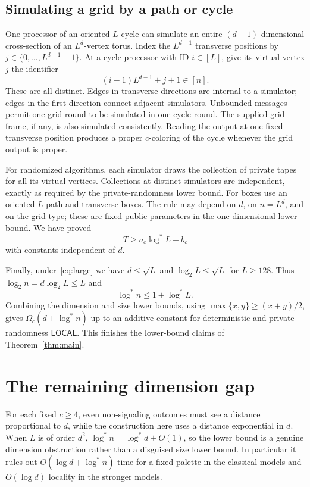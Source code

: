 \documentclass[11pt]{article}
\theoremstyle{definition}\newtheorem{definition}[theorem]{Definition}
\theoremstyle{remark}\newtheorem{remark}[theorem]{Remark}
\newcommand{\LOCAL}{\mathsf{LOCAL}}
\newcommand{\ls}{\log^*}
\begin{document}
\subsection{Simulating a grid by a path or cycle}

One processor of an oriented $L$-cycle can simulate an entire
$(d-1)$-dimensional cross-section of an $L^d$-vertex torus.
Index the $L^{d-1}$ transverse positions by
$j\in\{0,\ldots,L^{d-1}-1\}$. At a cycle processor with ID
$i\in[L]$, give its virtual vertex $j$ the identifier
\[
                           (i-1)L^{d-1}+j+1\in[n].
\]
These are all distinct. Edges in transverse directions are
internal to a simulator; edges in the first direction connect
adjacent simulators. Unbounded messages permit one grid round
to be simulated in one cycle round. The supplied grid frame,
if any, is also simulated consistently. Reading the output at
one fixed transverse position produces a proper $c$-coloring
of the cycle whenever the grid output is proper.

For randomized algorithms, each simulator draws the collection
of private tapes for all its virtual vertices. Collections
at distinct simulators are independent, exactly as required
by the private-randomness lower bound. For boxes use an
oriented $L$-path and transverse boxes. The rule may depend on
$d$, on $n=L^d$, and on the grid type; these are fixed public
parameters in the one-dimensional lower bound. We have proved
\[
                           T\ge a_c\ls L-b_c
\]
with constants independent of $d$.

Finally, under~\eqref{eq:large} we have $d\le\sqrt L$ and
$\log_2L\le\sqrt L$ for $L\ge128$. Thus
$\log_2 n=d\log_2L\le L$ and
\[
                              \ls n\le1+\ls L.
\]
Combining the dimension and size lower bounds, using
$\max\{x,y\}\ge(x+y)/2$, gives
$\Omega_c(d+\ls n)$ up to an additive constant for deterministic
and private-randomness $\LOCAL$. This finishes the lower-bound
claims of Theorem~\ref{thm:main}.

\section{The remaining dimension gap}\label{sec:gap}

For each fixed $c\ge4$, even non-signaling outcomes must see a
distance proportional to $d$, while the construction here uses
a distance exponential in $d$. When $L$ is of order $d^2$,
$\ls n=\ls d+O(1)$, so the lower bound is a genuine dimension
obstruction rather than a disguised size lower bound. In
particular it rules out $O(\log d+\ls n)$ time for a fixed
palette in the classical models and $O(\log d)$ locality
in the stronger models.
\end{document}
